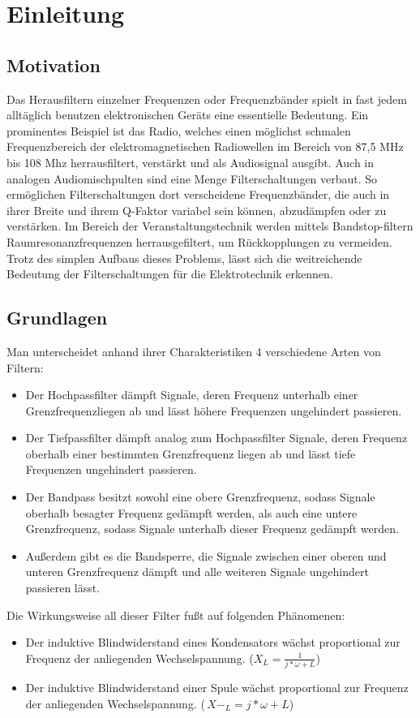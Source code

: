 \section{Einleitung}

\subsection{Motivation}
Das Herausfiltern einzelner Frequenzen oder Frequenzbänder spielt in fast jedem alltäglich benutzen elektronischen Geräts eine essentielle Bedeutung. Ein prominentes Beispiel ist das Radio, welches einen möglichst schmalen Frequenzbereich der elektromagnetischen Radiowellen im Bereich von 87,5 MHz bis 108 Mhz \cite{radio} herrausfiltert, verstärkt und als Audiosignal ausgibt.
Auch in analogen Audiomischpulten sind eine Menge Filterschaltungen verbaut. So ermöglichen Filterschaltungen dort verscheidene Frequenzbänder, die auch in ihrer Breite und ihrem Q-Faktor variabel sein können, abzudämpfen oder zu verstärken. Im Bereich der Veranstaltungstechnik werden mittels Bandstop-filtern Raumresonanzfrequenzen herrausgefiltert, um Rückkopplungen zu vermeiden. Trotz des simplen Aufbaus dieses Problems, lässt sich die weitreichende Bedeutung der Filterschaltungen für die Elektrotechnik erkennen.

\subsection{Grundlagen}
Man unterscheidet anhand ihrer Charakteristiken 4 verschiedene Arten von Filtern:
\begin{itemize}
\item Der Hochpassfilter dämpft Signale, deren Frequenz unterhalb einer Grenzfrequenzliegen ab und lässt höhere Frequenzen ungehindert passieren.
\item Der Tiefpassfilter dämpft analog zum Hochpassfilter Signale, deren Frequenz oberhalb einer bestimmten Grenzfrequenz liegen ab und lässt tiefe Frequenzen ungehindert passieren.
\item Der Bandpass besitzt sowohl eine obere Grenzfrequenz, sodass Signale oberhalb besagter Frequenz gedämpft werden, als auch eine untere Grenzfrequenz, sodass Signale unterhalb dieser Frequenz gedämpft werden.
\item Außerdem gibt es die Bandsperre, die Signale zwischen einer oberen und unteren Grenzfrequenz dämpft und alle weiteren Signale ungehindert passieren lässt.
\end{itemize}
Die Wirkungsweise all dieser Filter fußt auf folgenden Phänomenen:
\begin{itemize}
\item Der induktive Blindwiderstand eines Kondensators wächst proportional zur Frequenz der anliegenden Wechselspannung. ($X_{L}=\frac{1}{j*\omega+L}$) \cite{IBK}
\item Der induktive Blindwiderstand einer Spule wächst proportional zur Frequenz der anliegenden Wechselspannung. ($\,X-_{L}=j*\omega+L$) \cite{IBS}
\end{itemize}
